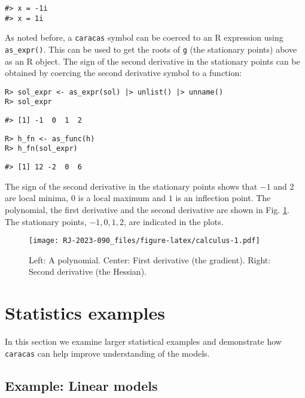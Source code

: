 \begin{verbatim}
#> x = -1i
#> x = 1i
\end{verbatim}

As noted before, a \texttt{caracas} symbol can be coerced to an R expression
using \texttt{as\_expr()}. This can be used to get the roots of \texttt{g}
(the stationary points) above as an R object.
The sign of the second derivative in the stationary points can be obtained
by coercing the second derivative symbol to a function:

\begin{verbatim}
R> sol_expr <- as_expr(sol) |> unlist() |> unname()
R> sol_expr
\end{verbatim}

\begin{verbatim}
#> [1] -1  0  1  2
\end{verbatim}

\begin{verbatim}
R> h_fn <- as_func(h)
R> h_fn(sol_expr)
\end{verbatim}

\begin{verbatim}
#> [1] 12 -2  0  6
\end{verbatim}

The sign of the second derivative in the stationary points shows that \(-1\) and
\(2\) are local minima, \(0\) is a local maximum and \(1\) is an inflection
point. The polynomial, the first derivative and the second derivative are shown in
Fig. \ref{fig:calculus}.
The stationary points, \(-1, 0, 1, 2\), are indicated in the plots.

\begin{figure}
\centering
\texttt{[image: RJ-2023-090\_files/figure-latex/calculus-1.pdf]}
\caption{\label{fig:calculus}Left: A polynomial. Center: First derivative (the gradient). Right: Second derivative (the Hessian).}
\end{figure}

\hypertarget{statistics-examples}{%
\section{Statistics examples}\label{statistics-examples}}

In this section we examine larger statistical examples and
demonstrate how \texttt{caracas} can help improve understanding of the models.

\hypertarget{example-linear-models}{%
\subsection{Example: Linear models}\label{example-linear-models}}

